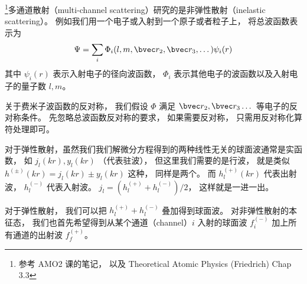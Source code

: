 
\begin{issues}
\issueDraft
\end{issues}

\footnote{参考 AMO2 课的笔记， 以及 Theoretical Atomic Physics (Friedrich) Chap 3.3}多通道散射（multi-channel scattering）研究的是非弹性散射（inelastic scattering）。 例如我们用一个电子或入射到一个原子或者粒子上， 将总波函数表示为
\begin{equation}
\Psi = \sum_i \Phi_i (l, m, \bvec r_2, \bvec r_3, \dots) \psi_i (r)
\end{equation}
其中 $\psi_i(r)$ 表示入射电子的径向波函数， $\Phi_i$ 表示其他电子的波函数以及入射电子的量子数 $l, m$。

关于费米子波函数的反对称， 我们假设 $\Phi$ 满足 $\bvec r_2, \bvec r_3 \dots$ 等电子的反对称条件。 先忽略总波函数反对称的要求， 如果需要反对称， 只需用反对称化算符处理即可。

对于弹性散射，虽然我们我们解微分方程得到的两种线性无关的球面波通常是实函数， 如 $j_l(kr), y_l(kr)$ （代表驻波）， 但这里我们需要的是行波， 就是类似 $h^{(\pm)}(kr) = j_l(kr) \pm y_l(kr)$ 这种， 同样是两个。 而 $h_l^{(+)}(kr)$ 代表出射波， $h_l^{(-)}$ 代表入射波。 $j_l = (h_l^{(+)} + h_l^{(-)})/2$， 这样就是一进一出。

对于弹性散射， 我们可以把 $h_l^{(+)} + h_l^{(-)}$ 叠加得到球面波。 对非弹性散射的本征态， 我们也首先希望得到从某个通道（channel）$i$ 入射的球面波 $f_i^{(-)}$ 加上所有通道的出射波 $f_f^{(+)}$。
